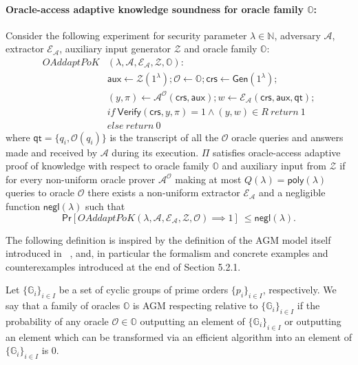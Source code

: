 \begin{definition}
\paragraph{Oracle-access adaptive knowledge soundness for oracle family $\mathbb{O}$:} Consider the following experiment for security 
parameter $\lambda \in \mathbb{N}$, adversary $\mathcal{A}$, extractor $\mathcal{E}_{\mathcal{A}}$, auxiliary 
input generator $\mathcal{Z}$ and oracle family $\mathbb{O}$:\\
\begin{align*}
\mathit{OAddaptPoK}&(\lambda, \mathcal{A}, \mathcal{E}_{\mathcal{A}}, \mathcal{Z}, \mathbb{O}): \\
& \mathsf{aux} \leftarrow \mathcal{Z}(1^{\lambda}); \mathcal{O} \leftarrow \mathbb{O}; \mathsf{crs} \leftarrow \mathsf{Gen}(1^{\lambda}); \\
& (y,\pi) \leftarrow \mathcal{A}^{\mathcal{O}}(\mathsf{crs},\mathsf{aux}); w \leftarrow \mathcal{E}_{\mathcal{A}}(\mathsf{crs}, \mathsf{aux}, \mathsf{qt}); \\
& if \ \mathsf{Verify}(\mathsf{crs}, y, \pi) = 1 \wedge (y,w) \in R \ return  \ 1 \\
& else \ return \ 0
\end{align*}
\noindent where $\mathsf{qt} = \{q_i, \mathcal{O}(q_i)\}$ is the transcript of all the $\mathcal{O}$ oracle queries and answers made and received by 
$\mathcal{A}$ during its execution. $\Pi$ satisfies oracle-access adaptive proof of knowledge with respect to oracle family  $\mathbb{O}$ and auxiliary 
input from $\mathcal{Z}$ if for every non-uniform oracle prover $\mathcal{A}^{\mathcal{O}}$  
making at most $Q(\lambda) = \mathsf{poly}(\lambda)$ queries to oracle $\mathcal{O}$ there exists a non-uniform extractor 
$\mathcal{E}_{\mathcal{A}}$ and a negligible function $\mathsf{negl}(\lambda)$ such that 
$$\mathsf{Pr}[\mathit{OAddaptPoK}(\lambda, \mathcal{A}, \mathcal{E}_{\mathcal{A}}, \mathcal{Z}, \mathcal{O}) \implies  1]\ \leq \mathsf{negl}(\lambda).$$ 
\end{definition} 

\noindent The following definition is inspired by the definition of the AGM model itself introduced in ~\cite{DBLP:phd/dnb/Loss19}, and, in particular the formalism and 
concrete examples and counterexamples introduced at the end of Section 5.2.1.  

\begin{definition}
\label{def:agm_oracles}
Let $\{\mathbb{G}_{i}\}_{i  \in I}$ be a set of cyclic groups of prime orders $\{p_i\}_{i \in I}$, respectively. 
We say that a family of oracles $\mathbb{O}$ is AGM respecting relative to 
$\{\mathbb{G}_{i}\}_{i  \in I}$ if the probability of any oracle $\mathcal{O} \in \mathbb{O}$ outputting an element of 
$\{\mathbb{G}_{i}\}_{i  \in I}$ or outputting an element which can be transformed via an efficient algorithm into an element 
of $\{\mathbb{G}_{i}\}_{i  \in I}$ is $0$. 
\end{definition}

